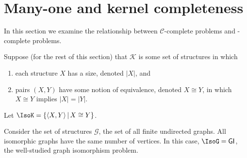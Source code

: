 \section{Many-one and kernel completeness}
\label{sec:npeqcompleteness}

In this section we examine the relationship between $\mathcal{C}$-complete problems and \CEq-complete problems.

Suppose (for the rest of this section) that $\mathcal{K}$ is some set of structures in which
\begin{enumerate}
\item each structure $X$ has a size, denoted $|X|$, and
\item pairs $(X, Y)$ have some notion of equivalence, denoted $X\cong Y$, in which $X\cong Y$ implies $|X|=|Y|$.
\end{enumerate}
Let $\IsoK=\lb\pair{X}{Y}\st X\cong Y\rb$.
\begin{example}
  Consider the set of structures $\mathcal{G}$, the set of all finite undirected graphs.
  All isomorphic graphs have the same number of vertices.
  In this case, $\IsoG=\GI$, the well-studied graph isomorphism problem.
\end{example}

